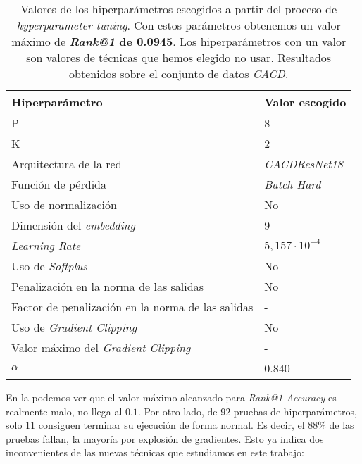 \begin{table}[!hbt]
\centering
\begin{tabular}{|l|l|}
    \hline
    \textbf{Hiperparámetro}                           & \textbf{Valor escogido} \\
    \hline
    P                                                 & 8                       \\
    K                                                 & 2                       \\
    Arquitectura de la red                            & \textit{CACDResNet18}   \\
    Función de pérdida                                & \textit{Batch Hard}     \\
    Uso de normalización                              & No                      \\
    Dimensión del \textit{embedding}                  & 9                       \\
    \textit{Learning Rate}                            & $5,157 \cdot 10^{-4}$   \\
    Uso de \textit{Softplus}                          & No                      \\
    Penalización en la norma de las salidas           & No                      \\
    Factor de penalización en la norma de las salidas & -                       \\
    Uso de \textit{Gradient Clipping}                 & No                      \\
    Valor máximo del \textit{Gradient Clipping}       & -                       \\
    $\alpha$                                          & 0.840                   \\

    \hline
\end{tabular}
\caption{Valores de los hiperparámetros escogidos a partir del proceso de \textit{hyperparameter tuning}. Con estos parámetros obtenemos un valor máximo de \textbf{\textit{Rank@1} de 0.0945}. Los hiperparámetros con un valor \entrecomillado{-} son valores de técnicas que hemos elegido no usar. Resultados obtenidos sobre el conjunto de datos \textit{CACD}.}
\label{table:hp_escogidos}
\end{table}

En la  podemos ver que el valor máximo alcanzado para \textit{Rank@1 Accuracy} es realmente malo, no llega al $0.1$. Por otro lado, de 92 pruebas de hiperparámetros, solo 11 consiguen terminar su ejecución de forma normal. Es decir, el 88\% de las pruebas fallan, la mayoría por explosión de gradientes. Esto ya indica dos inconvenientes de las nuevas técnicas que estudiamos en este trabajo:

